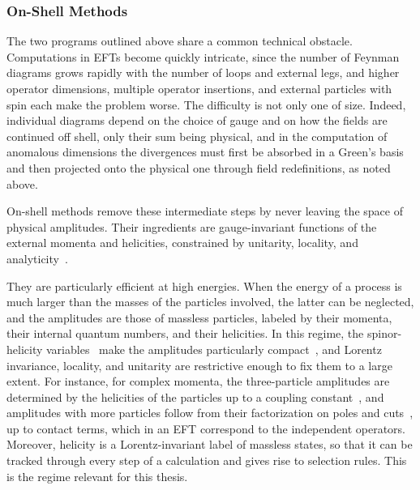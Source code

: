 \subsubsection*{On-Shell Methods}

The two programs outlined above share a common technical obstacle. Computations in EFTs become
quickly intricate, since the number of Feynman diagrams grows rapidly with the number of loops and
external legs, and higher operator dimensions, multiple operator insertions, and external particles
with spin each make the problem worse. The difficulty is not only one of size. Indeed, individual
diagrams depend on the choice of gauge and on how the fields are continued off shell, only their sum
being physical, and in the computation of anomalous dimensions the divergences must first be
absorbed in a Green's basis and then projected onto the physical one through field redefinitions, as
noted above.

On-shell methods remove these intermediate steps by never leaving the space of physical amplitudes.
Their ingredients are gauge-invariant functions of the external momenta and helicities, constrained
by unitarity, locality, and
analyticity~\cite{Mangano:1990by,Dixon:1996wi,Elvang:2013cua,Dixon:2013uaa,Cheung:2017pzi,Travaglini:2022uwo}.

They are particularly efficient at high energies. When the energy of a process is much larger than
the masses of the particles involved, the latter can be neglected, and the amplitudes are those of
massless particles, labeled by their momenta, their internal quantum numbers, and their helicities.
In this regime, the spinor-helicity
variables~\cite{Berends:1981rb,DeCausmaecker:1981jtq,Gunion:1985vca,Xu:1986xb} make the amplitudes
particularly compact~\cite{Parke:1986gb}, and Lorentz invariance, locality, and unitarity are
restrictive enough to fix them to a large extent. For instance, for complex momenta, the three-particle
amplitudes are determined by the helicities of the particles up to a coupling
constant~\cite{Benincasa:2007xk}, and amplitudes with more particles follow from their factorization
on poles and cuts~\cite{Britto:2004ap,Britto:2005fq}, up to contact terms, which in an EFT
correspond to the independent operators. 
Moreover, helicity is a Lorentz-invariant label of massless
states, so that it can be tracked through every step of a calculation and gives rise to selection
rules. This is the regime relevant for this thesis. 

